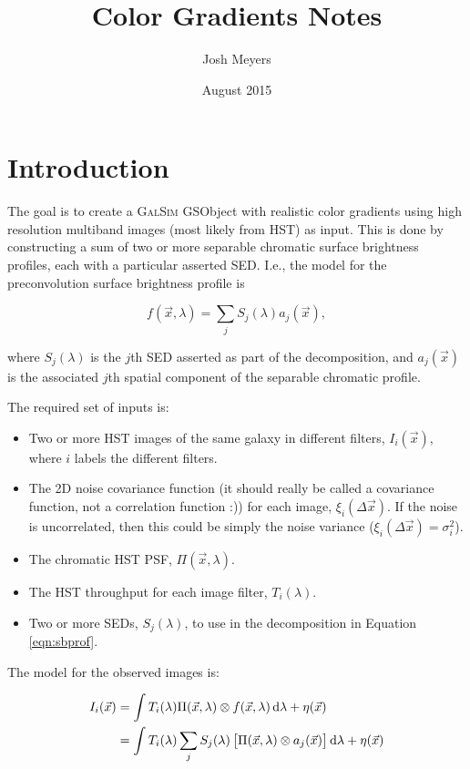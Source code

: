 \documentclass{article}
\title{Color Gradients Notes}
\author{Josh Meyers}
\date{August 2015}
\begin{document}
\section{Introduction}

The goal is to create a \textsc{GalSim} GSObject with realistic color gradients using high
resolution multiband images (most likely from HST) as input.  This is done by constructing a sum of
two or more separable chromatic surface brightness profiles, each with a particular asserted SED.
I.e., the model for the preconvolution surface brightness profile is

\begin{equation}
    \label{eqn:sbprof}
    f(\vec{x}, \lambda) = \sum_j S_j(\lambda) a_j(\vec{x}),
\end{equation}

where $S_j(\lambda)$ is the $j$th SED asserted as part of the decomposition, and $a_j(\vec{x})$ is
the associated $j$th spatial component of the separable chromatic profile.

The required set of inputs is:

\begin{itemize}

\item Two or more HST images of the same galaxy in different filters, $I_i(\vec{x})$, where $i$
labels the different filters.

\item The 2D noise covariance function (it should really be called a covariance function, not a
correlation function :)) for each image, $\xi_i(\Delta\vec{x})$.  If the noise is uncorrelated, then
this could be simply the noise variance ($\xi_i(\Delta\vec{x}) = \sigma^2_i$).

\item The chromatic HST PSF, $\Pi(\vec{x}, \lambda)$.

\item The HST throughput for each image filter, $T_i(\lambda)$.

\item Two or more SEDs, $S_j(\lambda)$, to use in the decomposition in Equation \ref{eqn:sbprof}.

\end{itemize}

The model for the observed images is:

\begin{align}
    I_i(\vec{x})
    &= \int T_i(\lambda) \Pi(\vec{x}, \lambda) \otimes f(\vec{x}, \lambda) \dif{\lambda} + \eta(\vec{x}) \\
    &= \int T_i(\lambda) \sum_j S_j(\lambda) \left[\Pi(\vec{x}, \lambda) \otimes a_j(\vec{x})\right] \dif{\lambda} + \eta(\vec{x})
\end{align}
\end{document}
